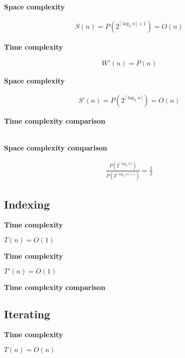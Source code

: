 \documentclass{article}
\newcommand{\tcomplex}{\textbf{Time complexity}}
\newcommand{\scomplex}{\textbf{Space complexity}}
\newcommand{\tcomplexcmp}{\textbf{Time complexity comparison}}
\newcommand{\scomplexcmp}{\textbf{Space complexity comparison}}
\newcommand{\timefn}{T}
\newcommand{\spacefn}{S}
\newcommand{\nwritesfn}{W}
\newcommand{\timenewfn}{\timefn'}
\newcommand{\spacenewfn}{\spacefn'}
\newcommand{\nwritesnewfn}{\nwritesfn'}
\newcommand{\bigo}{O}
\newcommand{\biggo}{P}
\newcommand{\varnitems}{n}
\begin{document}
	\scomplex
	
	\begin{align*}
	\spacefn(\varnitems) = \biggo(2^{\lceil \log_2 \varnitems \rceil + 1}) = \bigo(\varnitems)
	\end{align*}
	
	
	\tcomplex
	
	\begin{align*}
	\nwritesnewfn(\varnitems) = \biggo(\varnitems)
	\end{align*}
	
	\scomplex
	
	\begin{align*}
	\spacenewfn(\varnitems) = \biggo(2^{\lceil \log_2 \varnitems \rceil}) = \bigo(\varnitems)
	\end{align*}
	
	\tcomplexcmp
	
	\begin{align*}
	\end{align*}
	
	\scomplexcmp
	
	\begin{align*}
	\frac {\biggo(2^{\lceil \log_2 \varnitems \rceil})} {\biggo(2^{\lceil \log_2 \varnitems \rceil + 1})} = \frac{1}{2}
	\end{align*}
	
	\subsection{Indexing}
	
	
	\tcomplex
	
	$\timefn(\varnitems) = \bigo(1)$
	
	
	\tcomplex
	
	$\timenewfn(\varnitems) = \bigo(1)$
	
	\tcomplexcmp
	
	\subsection{Iterating}
	
	
	\tcomplex
	
	$\timefn(\varnitems) = \bigo(\varnitems)$
	
	
\end{document}
